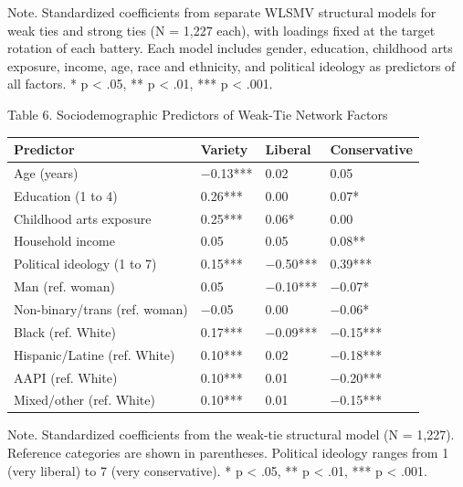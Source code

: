 \documentclass[
  12pt
]{article}
\begin{document}
Note. Standardized coefficients from separate WLSMV structural models for weak ties and strong ties (N = 1,227 each), with loadings fixed at the target rotation of each battery. Each model includes gender, education, childhood arts exposure, income, age, race and ethnicity, and political ideology as predictors of all factors. * p < .05, ** p < .01, *** p < .001.

Table 6. Sociodemographic Predictors of Weak-Tie Network Factors

\begin{tabular*}{\textwidth}{@{\extracolsep{\fill}}>{\raggedright\arraybackslash}p{} @{\hspace{1pt}}>{\raggedleft\arraybackslash}p{}@{\hspace{1pt}}>{\raggedleft\arraybackslash}p{}@{\hspace{1pt}}>{\raggedleft\arraybackslash}p{}@{}}
\toprule
Predictor & Variety & Liberal & Conservative \\
\midrule
Age (years) & $-$0.13*** & \hphantom{$-$}0.02 & \hphantom{$-$}0.05 \\
Education (1 to 4) & \hphantom{$-$}0.26*** & \hphantom{$-$}0.00 & \hphantom{$-$}0.07* \\
Childhood arts exposure & \hphantom{$-$}0.25*** & \hphantom{$-$}0.06* & \hphantom{$-$}0.00 \\
Household income & \hphantom{$-$}0.05 & \hphantom{$-$}0.05 & \hphantom{$-$}0.08** \\
Political ideology (1 to 7) & \hphantom{$-$}0.15*** & $-$0.50*** & \hphantom{$-$}0.39*** \\
Man (ref. woman) & \hphantom{$-$}0.05 & $-$0.10*** & $-$0.07* \\
Non-binary/trans (ref. woman) & $-$0.05 & \hphantom{$-$}0.00 & $-$0.06* \\
Black (ref. White) & \hphantom{$-$}0.17*** & $-$0.09*** & $-$0.15*** \\
Hispanic/Latine (ref. White) & \hphantom{$-$}0.10*** & \hphantom{$-$}0.02 & $-$0.18*** \\
AAPI (ref. White) & \hphantom{$-$}0.10*** & \hphantom{$-$}0.01 & $-$0.20*** \\
Mixed/other (ref. White) & \hphantom{$-$}0.10*** & \hphantom{$-$}0.01 & $-$0.15*** \\
\bottomrule
\end{tabular*}

Note. Standardized coefficients from the weak-tie structural model (N = 1,227). Reference categories are shown in parentheses. Political ideology ranges from 1 (very liberal) to 7 (very conservative). * p < .05, ** p < .01, *** p < .001.
\end{document}

